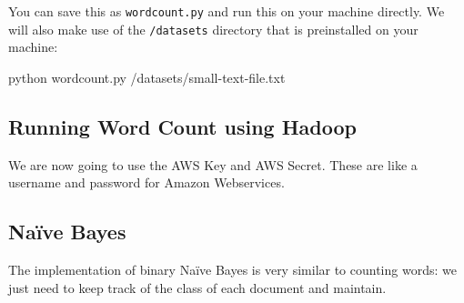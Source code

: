 You can save this as \texttt{wordcount.py} and run this on your machine
directly. We will also make use of the \texttt{/datasets} directory that is
preinstalled on your machine:

python wordcount.py /datasets/small-text-file.txt

\subsection{Running Word Count using Hadoop}

We are now going to use the AWS Key and AWS Secret. These are like a username
and password for Amazon Webservices.

\subsection{Naïve Bayes}

The implementation of binary Naïve Bayes is very similar to counting words: we just
need to keep track of the class of each document and maintain.

